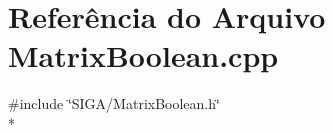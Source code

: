 \section{Referência do Arquivo Matrix\+Boolean.\+cpp}
\label{_matrix_boolean_8cpp}
{\ttfamily \#include \char`\"{}S\+I\+G\+A/\+Matrix\+Boolean.\+h\char`\"{}}\\*
